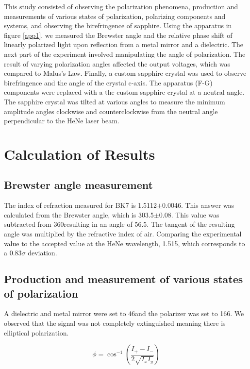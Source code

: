 \documentclass[aps,prl,twocolumn,superscriptaddress,nofootinbib]{revtex4-1}
\begin{document}
This study consisted of observing the polarization phenomena, production and measurements of various states of polarization, polarizing components and systems, and observing the birefringence of sapphire. Using the apparatus in figure \ref{app1}, we measured the Brewster angle and the relative phase shift of linearly polarized light upon reflection from a metal mirror and a dielectric. The next part of the experiment involved manipulating the angle of polarization. The result of varying polarization angles affected the output voltages, which was compared to Malus's Law. Finally, a custom sapphire crystal was used to observe birefringence and the angle of the crystal c-axis. The apparatus (F-G) components were replaced with a the custom sapphire crystal at a neutral angle. The sapphire crystal was tilted at various angles to measure the minimum amplitude angles clockwise and counterclockwise from the neutral angle perpendicular to the HeNe laser beam.

\vfill\eject



\section{Calculation of Results}
\subsection{Brewster angle measurement}
The index of refraction measured for BK7 is 1.5112$\pm$0.0046. This answer was calculated from the Brewster angle, which is 303.5\degree$\pm$0.08\degree. This value was subtracted from 360\degree resulting in an angle of 56.5\degree. The tangent of the resulting angle was multiplied by the refractive index of air. Comparing the experimental value to the accepted value at the HeNe wavelength, 1.515, which corresponds to a 0.83$\sigma$ deviation.

\subsection{Production and measurement of various states of polarization}
A dielectric and metal mirror were set to 46\degree and the polarizer was set to 166\degree. We observed that the signal was not completely extinguished meaning there is elliptical polarization.

\begin{equation}
\phi = \cos^{-1}\left(\frac{I_+-I_-}{2\sqrt{I_xI_y}}\right)
\label{phase}
\end{equation}
\end{document}
